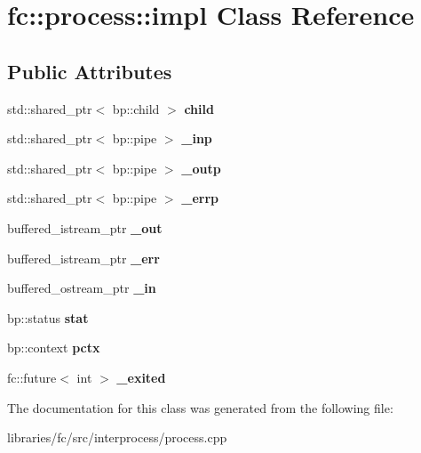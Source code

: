 \hypertarget{classfc_1_1process_1_1impl}{}\section{fc\+:\+:process\+:\+:impl Class Reference}
\label{classfc_1_1process_1_1impl}
\subsection*{Public Attributes}
\begin{DoxyCompactItemize}
\item 
\mbox{\label{classfc_1_1process_1_1impl_afb0bf380d0ab71fc5c4c176dc8c04d9d}} 
std\+::shared\+\_\+ptr$<$ bp\+::child $>$ {\bfseries child}
\item 
\mbox{\label{classfc_1_1process_1_1impl_a6cd566d0eaa70107701d90f8f9696c42}} 
std\+::shared\+\_\+ptr$<$ bp\+::pipe $>$ {\bfseries \+\_\+inp}
\item 
\mbox{\label{classfc_1_1process_1_1impl_a3f9df0eef8bbd4fcc8faac1e35b772cb}} 
std\+::shared\+\_\+ptr$<$ bp\+::pipe $>$ {\bfseries \+\_\+outp}
\item 
\mbox{\label{classfc_1_1process_1_1impl_a9576ff72b2aa4832df23c8e3a9efc5f8}} 
std\+::shared\+\_\+ptr$<$ bp\+::pipe $>$ {\bfseries \+\_\+errp}
\item 
\mbox{\label{classfc_1_1process_1_1impl_a13075131159d821d4ec121ac8a45a5c3}} 
buffered\+\_\+istream\+\_\+ptr {\bfseries \+\_\+out}
\item 
\mbox{\label{classfc_1_1process_1_1impl_ab36db23be72e25723681678f10ffac4e}} 
buffered\+\_\+istream\+\_\+ptr {\bfseries \+\_\+err}
\item 
\mbox{\label{classfc_1_1process_1_1impl_ad30de389f313b795cba873cea4954a4d}} 
buffered\+\_\+ostream\+\_\+ptr {\bfseries \+\_\+in}
\item 
\mbox{\label{classfc_1_1process_1_1impl_aaaedc39e5aa96be4ec8e676aeab7db7b}} 
bp\+::status {\bfseries stat}
\item 
\mbox{\label{classfc_1_1process_1_1impl_a19790cdb8fcf5b620ab532702c9728d8}} 
bp\+::context {\bfseries pctx}
\item 
\mbox{\label{classfc_1_1process_1_1impl_a5721dbb0ab23faadaab56847f50166a9}} 
fc\+::future$<$ int $>$ {\bfseries \+\_\+exited}
\end{DoxyCompactItemize}


The documentation for this class was generated from the following file\+:\begin{DoxyCompactItemize}
\item 
libraries/fc/src/interprocess/process.\+cpp\end{DoxyCompactItemize}
